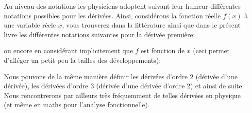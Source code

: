 \begin{enumerate}
		\begin{tcolorbox}[title=Remarque,colframe=black,arc=10pt]
		Au niveau des notations les physiciens adoptent suivant leur humeur différentes notations possibles pour les dérivées. Ainsi, considérons la fonction réelle $f(x)$ à une variable réele $x$, vous trouverez dans la littérature ainsi que dans le présent livre les différentes notations suivantes pour la dérivée première: 
		
		ou encore en considérant implicitement que $f$ est fonction de $x$ (ceci permet d'alléger un petit peu la tailles des développements):
		
		\end{tcolorbox}
	\end{enumerate}
	
	Nous pouvons de la même manière définir les dérivées d'ordre 2 (dérivée d'une dérivée), les dérivées d'ordre 3 (dérivée d'une dérivée d'ordre 2) et ainsi de suite. Nous rencontrerons par ailleurs très fréquemment de telles dérivées en physique (et même en maths pour l'analyse fonctionnelle).
	
